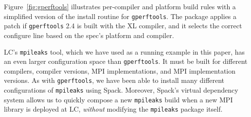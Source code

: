 Figure~\ref{fig:gperftools} illustrates per-compiler and platform build rules with
a simplified version of the install routine for {\tt gperftools}.
The package applies a patch if {\tt gperftools} 2.4 is built with the XL compiler,
and it selects the correct configure line based on the spec's platform and compiler.

LC's {\tt mpileaks} tool, which we have used as a running example in this paper,
has an even larger configuration space than {\tt gperftools}.  It must be built
for different compilers, compiler versions, MPI implementations, and MPI implementation
versions. As with {\tt gperftools}, we have been able to install many different
configurations of {\tt mpileaks} using Spack.  Moreover, Spack's virtual dependency system
allows us to
quickly compose a new {\tt mpileaks} build when a new MPI library is deployed at LC, {\it without}
modifying the {\tt mpileaks} package itself.

